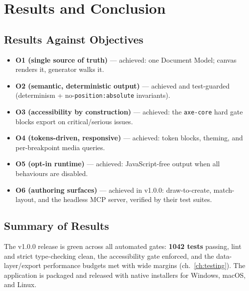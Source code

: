 
\chapter{Results and Conclusion}
\label{ch:results}

\section{Results Against Objectives}
\begin{itemize}[leftmargin=1.5em]
  \item \textbf{O1 (single source of truth)} --- achieved: one Document Model;
        canvas renders it, generator walks it.
  \item \textbf{O2 (semantic, deterministic output)} --- achieved and
        test-guarded (determinism + no-\texttt{position:absolute} invariants).
  \item \textbf{O3 (accessibility by construction)} --- achieved: the
        \texttt{axe-core} hard gate blocks export on critical/serious issues.
  \item \textbf{O4 (tokens-driven, responsive)} --- achieved: token blocks,
        theming, and per-breakpoint media queries.
  \item \textbf{O5 (opt-in runtime)} --- achieved: JavaScript-free output when all
        behaviours are disabled.
  \item \textbf{O6 (authoring surfaces)} --- achieved in v1.0.0: draw-to-create,
        match-layout, and the headless MCP server, verified by their test suites.
\end{itemize}

\section{Summary of Results}
The v1.0.0 release is green across all automated gates: \textbf{1042 tests}
passing, lint and strict type-checking clean, the accessibility gate enforced, and
the data-layer/export performance budgets met with wide margins
(ch.~\ref{ch:testing}). The application is packaged and released with native
installers for Windows, macOS, and Linux.

